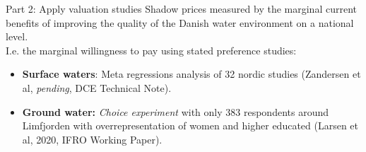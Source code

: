 \begin{frame}{Part 2: Apply valuation studies}
  Shadow prices measured by the marginal current benefits of improving the quality of the Danish water environment on a national level.\\\bigskip
  I.e. the marginal willingness to pay using stated preference studies:
  \begin{itemize}
    \item \textbf{Surface waters}: Meta regressions analysis of 32 nordic studies (Zandersen et al, \textit{pending}, DCE Technical Note).
    \item \textbf{Ground water:} \textit{Choice experiment} with only 383 respondents around Limfjorden with overrepresentation of women and higher educated (Larsen et al, 2020, IFRO Working Paper).
  \end{itemize}
\end{frame}